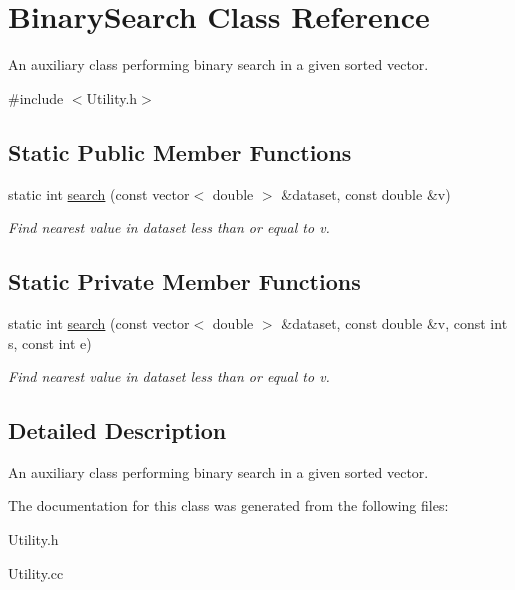 \hypertarget{classBinarySearch}{\section{Binary\-Search Class Reference}
\label{classBinarySearch}
}


An auxiliary class performing binary search in a given sorted vector.  




{\ttfamily \#include $<$Utility.\-h$>$}

\subsection*{Static Public Member Functions}
\begin{DoxyCompactItemize}
\item 
\hypertarget{classBinarySearch_a5d3444ca4e08a288332bdd1de212d4c7}{static int \hyperlink{classBinarySearch_a5d3444ca4e08a288332bdd1de212d4c7}{search} (const vector$<$ double $>$ \&dataset, const double \&v)}\label{classBinarySearch_a5d3444ca4e08a288332bdd1de212d4c7}

\begin{DoxyCompactList}\small\item\em Find nearest value in dataset less than or equal to v. \end{DoxyCompactList}\end{DoxyCompactItemize}
\subsection*{Static Private Member Functions}
\begin{DoxyCompactItemize}
\item 
\hypertarget{classBinarySearch_a0b586329e8e70b2cf146f69d92d3ce57}{static int \hyperlink{classBinarySearch_a0b586329e8e70b2cf146f69d92d3ce57}{search} (const vector$<$ double $>$ \&dataset, const double \&v, const int s, const int e)}\label{classBinarySearch_a0b586329e8e70b2cf146f69d92d3ce57}

\begin{DoxyCompactList}\small\item\em Find nearest value in dataset less than or equal to v. \end{DoxyCompactList}\end{DoxyCompactItemize}


\subsection{Detailed Description}
An auxiliary class performing binary search in a given sorted vector. 

The documentation for this class was generated from the following files\-:\begin{DoxyCompactItemize}
\item 
Utility.\-h\item 
Utility.\-cc\end{DoxyCompactItemize}

